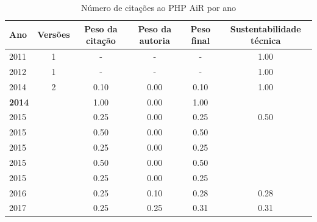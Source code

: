 \begin{table}[H]
\caption{Número de citações ao PHP AiR por ano}
\centering
\begin{tabular}{| l | c | c | c | c | c |}
  \hline
  Ano & Versões & Peso da citação & Peso da autoria & Peso final & Sustentabilidade técnica \\
  \hline
        2011 & 1 & - & - & -
        &
          {\color{blue} 1.00}
        \\
\hline
        2012 & 1 & - & - & -
        &
          {\color{blue} 1.00}
        \\
\hline
            2014
          &
          2
          &
          0.10
          &
          0.00
          &
          0.10
          &
            {\color{blue} 1.00}
          \\
            {\bf 2014}
          &
          
          &
          1.00
          &
          0.00
          &
          1.00
          &
          \\
\hline
            2015
          &
          
          &
          0.25
          &
          0.00
          &
          0.25
          &
            {\color{blue} 0.50}
          \\
            2015
          &
          
          &
          0.50
          &
          0.00
          &
          0.50
          &
          \\
            2015
          &
          
          &
          0.25
          &
          0.00
          &
          0.25
          &
          \\
            2015
          &
          
          &
          0.50
          &
          0.00
          &
          0.50
          &
          \\
            2015
          &
          
          &
          0.25
          &
          0.00
          &
          0.25
          &
          \\
\hline
            2016
          &
          
          &
          0.25
          &
          0.10
          &
          0.28
          &
            {\color{red} 0.28}
          \\
\hline
            2017
          &
          
          &
          0.25
          &
          0.25
          &
          0.31
          &
            {\color{red} 0.31}
          \\
\hline
\end{tabular}
\end{table}



